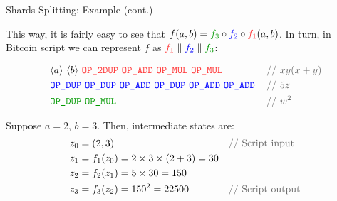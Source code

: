 \documentclass{zkdl-presentation-template}
\newcommand{\elem}[1]{\, \langle #1 \rangle \,}
\newcommand{\opcode}[1]{\, \texttt{#1} \,}
\begin{document}
  \begin{frame}{Shards Splitting: Example (cont.)}  
  \begin{example}
    This way, it is fairly easy to see that $f(a,b) = \textcolor{green!60!black}{f_3} \circ \textcolor{blue}{f_2} \circ \textcolor{red!80!white}{f_1}(a,b)$. In turn, in Bitcoin
  script we can represent $f$ as $\textcolor{red!80!white}{f_1} \parallel \textcolor{blue}{f_2} \parallel \textcolor{green!60!black}{f_3}$:
      \begin{empheqboxed}
        \scriptsize
        \begin{align*}
            &\elem{a} \elem{b} \textcolor{red!80!white}{\opcode{\texttt{OP\_2DUP}} \opcode{\texttt{OP\_ADD}} \opcode{\texttt{OP\_MUL}} \opcode{\texttt{OP\_MUL}}} && \textcolor{gray!80!black}{\text{// $xy(x+y)$}} \\
            &\textcolor{blue}{\opcode{\texttt{OP\_DUP}} \opcode{\texttt{OP\_DUP}} \opcode{\texttt{OP\_ADD}} \opcode{\texttt{OP\_DUP}} \opcode{\texttt{OP\_ADD}} \opcode{\texttt{OP\_ADD}}} && \textcolor{gray!80!black}{\text{// $5z$}} \\
            &\textcolor{green!60!black}{\opcode{\texttt{OP\_DUP}} \opcode{\texttt{OP\_MUL}}}&&\textcolor{gray!80!black}{\text{// $w^2$}}
        \end{align*}
      \end{empheqboxed}

      Suppose $a=2$, $b=3$. Then, intermediate states are:
      \begin{align*}
          & z_0 = (2,3) && \textcolor{gray!80!black}{\text{// Script input}} \\
          & z_1 = f_1(z_0) = 2 \times 3 \times (2+3) = 30 && \\
          & z_2 = f_2(z_1) = 5 \times 30 = 150 && \\
          & z_3 = f_3(z_2) = 150^2 = 22500 && \textcolor{gray!80!black}{\text{// Script output}}
      \end{align*}
  \end{example}
  \end{frame}
\end{document}
